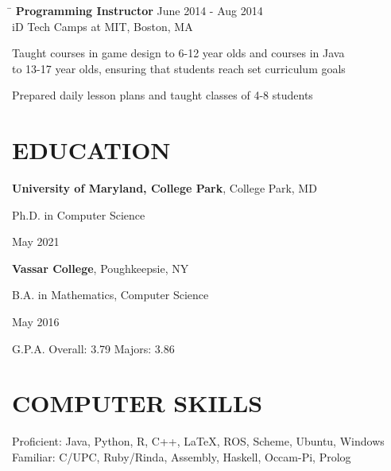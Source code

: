 \documentclass{res}
\begin{document}
\begin{resume}
{    \vspace{-12pt}
    \begin{tabbing}
      \hspace{5.65in}\=  \kill %
      {\bf Programming Instructor}
      \>June 2014 - Aug 2014\\
      iD Tech Camps at MIT, Boston, MA\\     
    \end{tabbing}
    \vspace{-24pt}      %
    \begin{list}{\bf{-}}{}
      \setlength{\itemsep}{-2pt}
      \item Taught courses in game design to 6-12 year olds and courses in
            Java\\ to 13-17 year olds, ensuring that students reach set
            curriculum goals
      \item Prepared daily lesson plans and taught classes of 4-8 students
    \end{list}
    \vspace{-2pt}

  \section{\hspace{0.2in}EDUCATION}
    \vspace{3pt} %
    {\bf University of Maryland, College Park}, College Park, MD\\
    \begin{minipage}{5.6in}
      Ph.D. in Computer Science
    \end{minipage}
    \begin{minipage}{2in}
      May 2021
    \end{minipage}

    \vspace{-5pt} %
    {\bf Vassar College}, Poughkeepsie, NY\\
    \begin{minipage}{5.6in}
      B.A. in Mathematics, Computer Science
    \end{minipage}
    \begin{minipage}{2in}
      May 2016
    \end{minipage}
    G.P.A. Overall: 3.79  Majors: 3.86

  \vspace{-1pt}
  \section{\hspace{0.2in}COMPUTER SKILLS}
    \vspace{3pt}
      Proficient: Java, Python, R, C++, LaTeX, ROS, Scheme, Ubuntu,
      Windows\\
      Familiar: C/UPC, Ruby/Rinda, Assembly, Haskell, Occam-Pi, Prolog\\

}
\end{resume}
\end{document}
